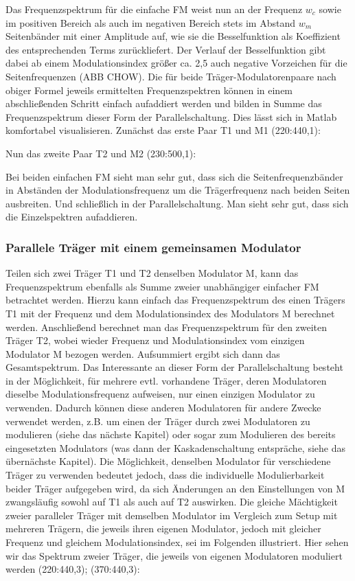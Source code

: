 Das Frequenzspektrum für die einfache FM weist nun an der Frequenz \begin{math} w_c \end{math} sowie im positiven Bereich als auch im negativen Bereich stets im Abstand \begin{math} w_m \end{math} Seitenbänder mit einer Amplitude auf, wie sie die Besselfunktion als Koeffizient des entsprechenden Terms zurückliefert. Der Verlauf der Besselfunktion gibt dabei ab einem Modulationsindex größer ca. 2,5 auch negative Vorzeichen für die Seitenfrequenzen (ABB CHOW). Die für beide Träger-Modulatorenpaare nach obiger Formel jeweils ermittelten Frequenzspektren können in einem abschließenden Schritt einfach aufaddiert werden und bilden in Summe das Frequenzspektrum dieser Form der Parallelschaltung. Dies lässt sich in Matlab komfortabel visualisieren. Zunächst das erste Paar T1 und M1 (220:440,1):

Nun das zweite Paar T2 und M2 (230:500,1):

Bei beiden einfachen FM sieht man sehr gut, dass sich die Seitenfrequenzbänder in Abständen der Modulationsfrequenz um die Trägerfrequenz nach beiden Seiten ausbreiten. Und schließlich in der Parallelschaltung. Man sieht sehr gut, dass sich die Einzelspektren aufaddieren. 


\subsubsection{Parallele Träger mit einem gemeinsamen Modulator}

Teilen sich zwei Träger T1 und T2 denselben Modulator M, kann das Frequenzspektrum ebenfalls als Summe zweier unabhängiger einfacher FM betrachtet werden. Hierzu kann einfach das Frequenzspektrum des einen Trägers T1 mit der Frequenz und dem Modulationsindex des Modulators M berechnet werden. Anschließend berechnet man das Frequenzspektrum für den zweiten Träger T2, wobei wieder Frequenz und Modulationsindex vom einzigen Modulator M bezogen werden. Aufsummiert ergibt sich dann das Gesamtspektrum. Das Interessante an dieser Form der Parallelschaltung  besteht in der Möglichkeit, für mehrere evtl. vorhandene Träger, deren Modulatoren dieselbe Modulationsfrequenz aufweisen, nur einen einzigen Modulator zu verwenden. Dadurch können diese anderen Modulatoren für andere Zwecke verwendet werden, z.B. um einen der Träger durch zwei Modulatoren zu modulieren (siehe das nächste Kapitel) oder sogar zum Modulieren des bereits eingesetzten Modulators (was dann der Kaskadenschaltung entspräche, siehe das übernächste Kapitel). Die Möglichkeit, denselben Modulator für verschiedene Träger zu verwenden bedeutet jedoch, dass die individuelle Modulierbarkeit beider Träger aufgegeben wird, da sich Änderungen an den Einstellungen von M zwangsläufig sowohl auf T1 als auch auf T2 auswirken. Die gleiche Mächtigkeit zweier paralleler Träger mit demselben Modulator im Vergleich zum Setup mit mehreren Trägern, die jeweils ihren eigenen Modulator, jedoch mit gleicher Frequenz und gleichem Modulationsindex, sei im Folgenden illustriert. Hier sehen wir das Spektrum zweier Träger, die jeweils von eigenen Modulatoren moduliert werden (220:440,3); (370:440,3):

